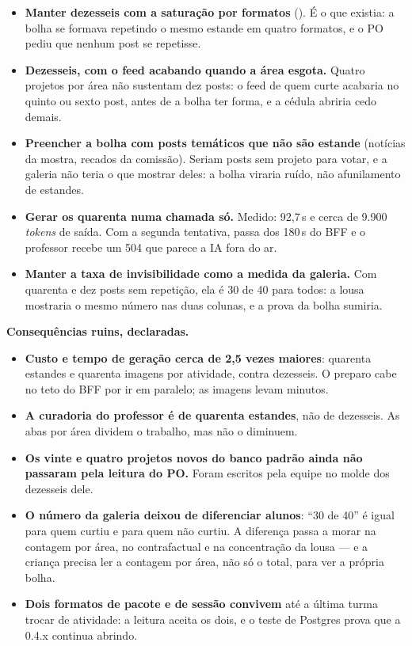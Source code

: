 \begin{itemize}
  \item \textbf{Manter dezesseis com a saturação por formatos}
    (). É o que existia: a bolha se formava repetindo o mesmo
    estande em quatro formatos, e o PO pediu que nenhum post se repetisse.
  \item \textbf{Dezesseis, com o feed acabando quando a área esgota.} Quatro
    projetos por área não sustentam dez posts: o feed de quem curte acabaria no
    quinto ou sexto post, antes de a bolha ter forma, e a cédula abriria cedo
    demais.
  \item \textbf{Preencher a bolha com posts temáticos que não são estande}
    (notícias da mostra, recados da comissão). Seriam posts sem projeto para
    votar, e a galeria não teria o que mostrar deles: a bolha viraria ruído,
    não afunilamento de estandes.
  \item \textbf{Gerar os quarenta numa chamada só.} Medido: 92,7\,s e cerca de
    9.900 \emph{tokens} de saída. Com a segunda tentativa, passa dos 180\,s do
    BFF e o professor recebe um 504 que parece a IA fora do ar.
  \item \textbf{Manter a taxa de invisibilidade como a medida da galeria.} Com
    quarenta e dez posts sem repetição, ela é 30 de 40 para todos: a lousa
    mostraria o mesmo número nas duas colunas, e a prova da bolha sumiria.
\end{itemize}

\textbf{Consequências ruins, declaradas.}

\begin{itemize}
  \item \textbf{Custo e tempo de geração cerca de 2,5 vezes maiores}: quarenta
    estandes e quarenta imagens por atividade, contra dezesseis. O preparo cabe
    no teto do BFF por ir em paralelo; as imagens levam minutos.
  \item \textbf{A curadoria do professor é de quarenta estandes}, não de
    dezesseis. As abas por área dividem o trabalho, mas não o diminuem.
  \item \textbf{Os vinte e quatro projetos novos do banco padrão ainda não
    passaram pela leitura do PO.} Foram escritos pela equipe no molde dos
    dezesseis dele.
  \item \textbf{O número da galeria deixou de diferenciar alunos}: \enquote{30
    de 40} é igual para quem curtiu e para quem não curtiu. A diferença passa a
    morar na contagem por área, no contrafactual e na concentração da lousa ---
    e a criança precisa ler a contagem por área, não só o total, para ver a
    própria bolha.
  \item \textbf{Dois formatos de pacote e de sessão convivem} até a última turma
    trocar de atividade: a leitura aceita os dois, e o teste de Postgres prova
    que a 0.4.x continua abrindo.
\end{itemize}


